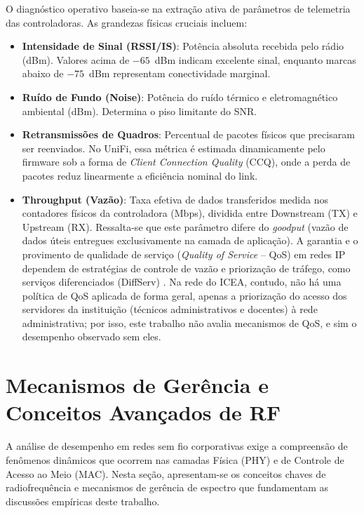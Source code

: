 O diagnóstico operativo baseia-se na extração ativa de parâmetros de telemetria das controladoras. As grandezas físicas cruciais incluem:
\begin{itemize}
	\item \textbf{Intensidade de Sinal (RSSI/IS)}: Potência absoluta recebida pelo rádio (dBm). Valores acima de $-65$~dBm indicam excelente sinal, enquanto marcas abaixo de $-75$~dBm representam conectividade marginal.
	\item \textbf{Ruído de Fundo (Noise)}: Potência do ruído térmico e eletromagnético ambiental (dBm). Determina o piso limitante do SNR.
	\item \textbf{Retransmissões de Quadros}: Percentual de pacotes físicos que precisaram ser reenviados. No UniFi, essa métrica é estimada dinamicamente pelo firmware sob a forma de \textit{Client Connection Quality} (\acs{CCQ}), onde a perda de pacotes reduz linearmente a eficiência nominal do link.
	\item \textbf{Throughput (Vazão)}: Taxa efetiva de dados transferidos medida nos contadores físicos da controladora (Mbps), dividida entre Downstream (TX) e Upstream (RX). Ressalta-se que este parâmetro difere do \textit{goodput} (vazão de dados úteis entregues exclusivamente na camada de aplicação). A garantia e o provimento de qualidade de serviço (\textit{Quality of Service} -- QoS) em redes IP dependem de estratégias de controle de vazão e priorização de tráfego, como serviços diferenciados (DiffServ) \cite{santos2017qos}. Na rede do ICEA, contudo, não há uma política de QoS aplicada de forma geral, apenas a priorização do acesso dos servidores da instituição (técnicos administrativos e docentes) à rede administrativa; por isso, este trabalho não avalia mecanismos de QoS, e sim o desempenho observado sem eles.
\end{itemize}

\section{Mecanismos de Gerência e Conceitos Avançados de RF}
\label{sec:fundamentacao_conceitos_avancados}

A análise de desempenho em redes sem fio corporativas exige a compreensão de fenômenos dinâmicos que ocorrem nas camadas Física (PHY) e de Controle de Acesso ao Meio (MAC). Nesta seção, apresentam-se os conceitos chaves de radiofrequência e mecanismos de gerência de espectro que fundamentam as discussões empíricas deste trabalho.

